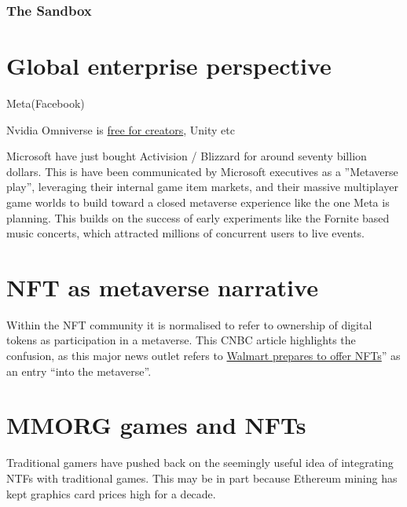 \subsubsection{The Sandbox}
\section{Global enterprise perspective}
Meta(Facebook)

Nvidia Omniverse is \href{https://www.nvidia.com/en-us/omniverse/creators/}{free for creators}, Unity etc \par

Microsoft have just bought Activision / Blizzard for around seventy billion dollars. This is have been communicated by Microsoft executives as a ''Metaverse play'', leveraging their internal game item markets, and their massive multiplayer game worlds to build toward a closed metaverse experience like the one Meta is planning.
This builds on the success of early experiments like the Fornite based music concerts, which attracted millions of concurrent users to live events.

\section{NFT as metaverse narrative}
Within the NFT community it is normalised to refer to ownership of digital tokens as participation in a metaverse. 
This CNBC article highlights the confusion, as this major news outlet refers to \href{https://www.cnbc.com/2022/01/16/walmart-is-quietly-preparing-to-enter-the-metaverse.html}{Walmart prepares to offer NFTs}'' as an entry ``into the metaverse''.
\section{MMORG games and NFTs}
Traditional gamers have pushed back on the seemingly useful idea of integrating NTFs with traditional games. This may be in part because Ethereum mining has kept graphics card prices high for a decade.

